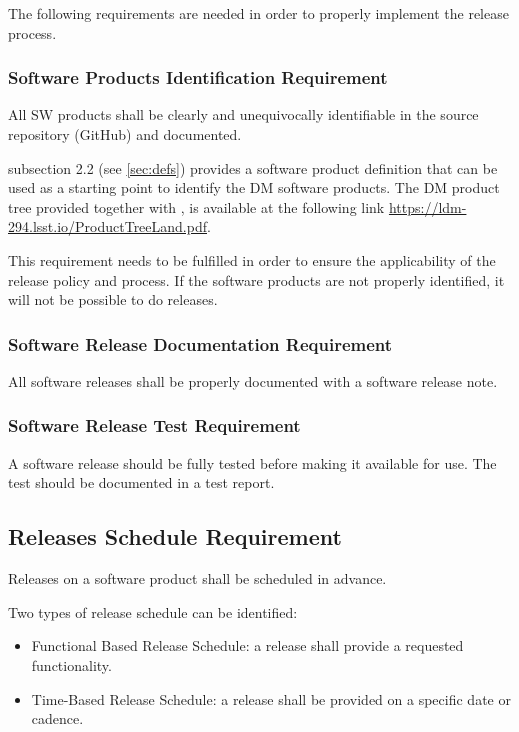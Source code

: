 The following requirements are needed in order to properly implement the release process.


\subsubsection{Software Products Identification Requirement} \label{sec:swid}

All \gls{SW} products shall be clearly and unequivocally identifiable in the source repository (GitHub) and documented.

 subsection 2.2 (see \ref{sec:defs}) provides a software product definition that can be used as a starting point to identify the DM software products.
The DM product tree provided together with , is available at the following link \url{https://ldm-294.lsst.io/ProductTreeLand.pdf}.

This requirement needs to be fulfilled in order to ensure the applicability of the release policy and process.
If the software products are not properly identified, it will not be possible to do releases.


\subsubsection{Software Release Documentation Requirement} \label{sec:reqdoc}

All software releases shall be properly documented with a software release note.


\subsubsection{Software Release Test Requirement} \label{sec:test}
 
A software release should be fully tested before making it available for use.
The test should be documented in a test report.


\subsection{Releases Schedule Requirement} \label{sec:milestone}

Releases on a software product shall be scheduled in advance.

Two types of release schedule can be identified:

\begin{itemize}
\item Functional Based Release Schedule: a release shall provide a requested functionality.
\item Time-Based Release Schedule: a release shall be provided on a specific date or cadence.
\end{itemize}

